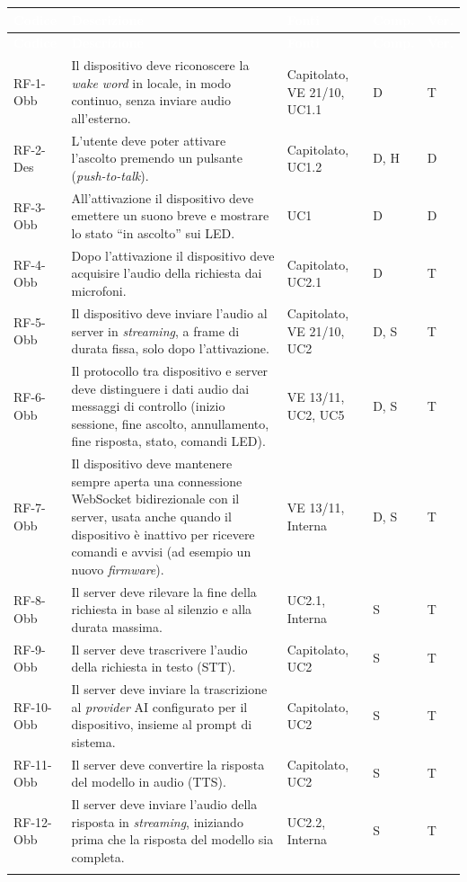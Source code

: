 \documentclass[12pt,a4paper]{article}
\newcommand{\thc}[1]{\textcolor{white}{\textbf{#1}}}
\newcommand{\rl}{\\ \arrayrulecolor{bfline}\hline}
\begin{document}
\begin{longtable}{>{\raggedright\arraybackslash}p{}>{\raggedright\arraybackslash}p{}>{\raggedright\arraybackslash}p{}>{\raggedright\arraybackslash}p{}>{\centering\arraybackslash}p{}}
\rowcolor{bfblue}\thc{Codice} & \thc{Descrizione} & \thc{Fonti} & \thc{Comp.} & \thc{Ver.} \\
\endfirsthead
\rowcolor{bfblue}\thc{Codice} & \thc{Descrizione} & \thc{Fonti} & \thc{Comp.} & \thc{Ver.} \\
\endhead
RF-1-Obb & Il dispositivo deve riconoscere la \emph{wake word} in locale, in modo continuo, senza inviare audio all'esterno. & Capitolato, VE 21/10, UC1.1 & D & T \rl
RF-2-Des & L'utente deve poter attivare l'ascolto premendo un pulsante (\emph{push-to-talk}). & Capitolato, UC1.2 & D, H & D \rl
RF-3-Obb & All'attivazione il dispositivo deve emettere un suono breve e mostrare lo stato ``in ascolto'' sui LED. & UC1 & D & D \rl
RF-4-Obb & Dopo l'attivazione il dispositivo deve acquisire l'audio della richiesta dai microfoni. & Capitolato, UC2.1 & D & T \rl
RF-5-Obb & Il dispositivo deve inviare l'audio al server in \emph{streaming}, a frame di durata fissa, solo dopo l'attivazione. & Capitolato, VE 21/10, UC2 & D, S & T \rl
RF-6-Obb & Il protocollo tra dispositivo e server deve distinguere i dati audio dai messaggi di controllo (inizio sessione, fine ascolto, annullamento, fine risposta, stato, comandi LED). & VE 13/11, UC2, UC5 & D, S & T \rl
RF-7-Obb & Il dispositivo deve mantenere sempre aperta una connessione WebSocket bidirezionale con il server, usata anche quando il dispositivo è inattivo per ricevere comandi e avvisi (ad esempio un nuovo \emph{firmware}). & VE 13/11, Interna & D, S & T \rl
RF-8-Obb & Il server deve rilevare la fine della richiesta in base al silenzio e alla durata massima. & UC2.1, Interna & S & T \rl
RF-9-Obb & Il server deve trascrivere l'audio della richiesta in testo (STT). & Capitolato, UC2 & S & T \rl
RF-10-Obb & Il server deve inviare la trascrizione al \emph{provider} AI configurato per il dispositivo, insieme al prompt di sistema. & Capitolato, UC2 & S & T \rl
RF-11-Obb & Il server deve convertire la risposta del modello in audio (TTS). & Capitolato, UC2 & S & T \rl
RF-12-Obb & Il server deve inviare l'audio della risposta in \emph{streaming}, iniziando prima che la risposta del modello sia completa. & UC2.2, Interna & S & T \rl

\end{longtable}
\end{document}
